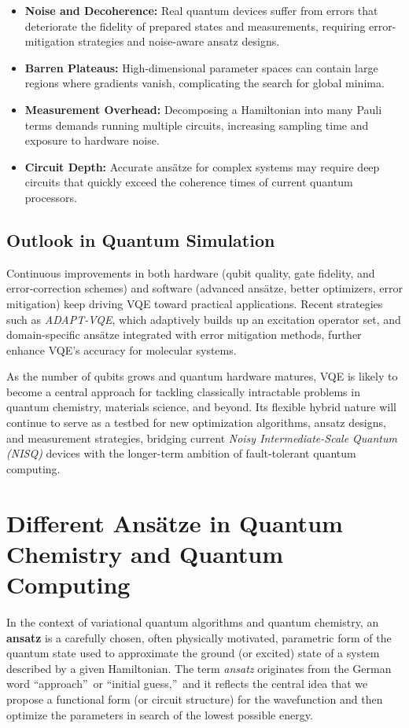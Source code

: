 \begin{itemize}
    \item \textbf{Noise and Decoherence:} 
    Real quantum devices suffer from errors that deteriorate the fidelity of prepared states and measurements, requiring error-mitigation strategies and noise-aware ansatz designs.

    \item \textbf{Barren Plateaus:}
    High-dimensional parameter spaces can contain large regions where gradients vanish, complicating the search for global minima.

    \item \textbf{Measurement Overhead:}
    Decomposing a Hamiltonian into many Pauli terms demands running multiple circuits, increasing sampling time and exposure to hardware noise.

    \item \textbf{Circuit Depth:}
    Accurate ans\"atze for complex systems may require deep circuits that quickly exceed the coherence times of current quantum processors.
\end{itemize}

\subsection{Outlook in Quantum Simulation}
\label{subsec:vqe_outlook}

Continuous improvements in both hardware (qubit quality, gate fidelity, and error-correction schemes) and software (advanced ans\"atze, better optimizers, error mitigation) keep driving VQE toward practical applications. Recent strategies such as \emph{ADAPT-VQE}, which adaptively builds up an excitation operator set, and domain-specific ans\"atze integrated with error mitigation methods, further enhance VQE’s accuracy for molecular systems. 

As the number of qubits grows and quantum hardware matures, VQE is likely to become a central approach for tackling classically intractable problems in quantum chemistry, materials science, and beyond. Its flexible hybrid nature will continue to serve as a testbed for new optimization algorithms, ansatz designs, and measurement strategies, bridging current \emph{Noisy Intermediate-Scale Quantum (NISQ)} devices with the longer-term ambition of fault-tolerant quantum computing.

\section{Different Ans\"{a}tze in Quantum Chemistry and Quantum Computing}
In the context of variational quantum algorithms and quantum chemistry, an \textbf{ansatz} is a carefully chosen, often physically motivated, parametric form of the quantum state used to approximate the ground (or excited) state of a system described by a given Hamiltonian. The term \textit{ansatz} originates from the German word \textquotedblleft approach\textquotedblright\ or \textquotedblleft initial guess,\textquotedblright\ and it reflects the central idea that we propose a functional form (or circuit structure) for the wavefunction and then optimize the parameters in search of the lowest possible energy. 

